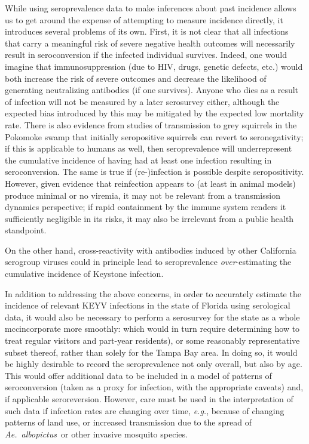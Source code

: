 \documentclass[12pt]{article}
\newcommand{\alb}{\textit{Ae.\ albopictus}}
\newcommand{\eg}{\textit{e.g.}}
\newcommand{\cjh}{\textcolor{blue}{cjh}}
\newcommand{\msg}[3]{(#1 $\rightarrow$ #2: #3)}
\newcommand{\mcc}[1]{\msg\cjh\cjh{#1}}
\begin{document}
        While using seroprevalence data to make inferences about past incidence allows us to get around the expense of attempting to measure incidence directly, it introduces several problems of its own. First, it is not clear that all infections that carry a meaningful risk of severe negative health outcomes will necessarily result in seroconversion if the infected individual survives. Indeed, one would imagine that immunosuppression (due to HIV, drugs, genetic defects, etc.) would both increase the risk of severe outcomes and decrease the likelihood of generating neutralizing antibodies (if one survives). Anyone who dies as a result of infection will not be measured by a later serosurvey either, although the expected bias introduced by this may be mitigated by the expected low mortality rate. There is also evidence from studies of transmission to grey squirrels in the Pokomoke swamp\cite{watts1988maintenance} that initially seropositive squirrels can revert to seronegativity; if this is applicable to humans as well, then seroprevalence will underrepresent the cumulative incidence of having had at least one infection resulting in seroconversion. The same is true if (re-)infection is possible despite seropositivity. However, given evidence that reinfection appears to (at least in animal models) produce minimal or no viremia\cite{watts1988maintenance,watts1979experimental}, it may not be relevant from a transmission dynamics perspective; if rapid containment by the immune system renders it sufficiently negligible in its risks, it may also be irrelevant from a public health standpoint. 

        On the other hand, cross-reactivity with antibodies induced by other California serogroup viruses could in principle lead to seroprevalence \textit{over}-estimating the cumulative incidence of Keystone infection.

        In addition to addressing the above concerns, in order to accurately estimate the incidence of relevant KEYV infections in the state of Florida using serological data, it would also be necessary to perform a serosurvey for the state as a whole mcc{incorporate more smoothly: which would in turn require determining how to treat regular visitors and part-year residents}), or some reasonably representative subset thereof, rather than solely for the Tampa Bay area. In doing so, it would be highly desirable to record the seroprevalence not only overall, but also by age. This would offer additional data to be included in a model of patterns of seroconversion (taken as a proxy for infection, with the appropriate caveats) and, if applicable seroreversion. However, care must be used in the interpretation of such data if infection rates are changing over time, \eg, because of changing patterns of land use, or increased transmission due to the spread of \alb\ or other invasive mosquito species.
\end{document}
